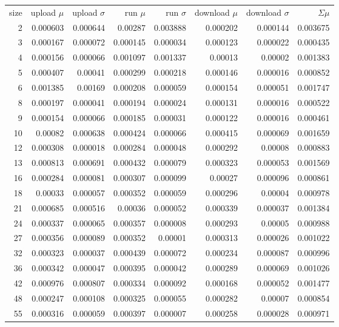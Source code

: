 \begin{longtable}{r r r r r r r r}
size & upload $\mu$  & upload $\sigma$ & run $\mu$ & run $\sigma$ & download $\mu$ & download $\sigma$ & $\Sigma \mu$ \\
2 & 0.000603 & 0.000644 & 0.00287 & 0.003888 & 0.000202 & 0.000144 & 0.003675 \\
3 & 0.000167 & 0.000072 & 0.000145 & 0.000034 & 0.000123 & 0.000022 & 0.000435 \\
4 & 0.000156 & 0.000066 & 0.001097 & 0.001337 & 0.00013 & 0.00002 & 0.001383 \\
5 & 0.000407 & 0.00041 & 0.000299 & 0.000218 & 0.000146 & 0.000016 & 0.000852 \\
6 & 0.001385 & 0.00169 & 0.000208 & 0.000059 & 0.000154 & 0.000051 & 0.001747 \\
8 & 0.000197 & 0.000041 & 0.000194 & 0.000024 & 0.000131 & 0.000016 & 0.000522 \\
9 & 0.000154 & 0.000066 & 0.000185 & 0.000031 & 0.000122 & 0.000016 & 0.000461 \\
10 & 0.00082 & 0.000638 & 0.000424 & 0.000066 & 0.000415 & 0.000069 & 0.001659 \\
12 & 0.000308 & 0.000018 & 0.000284 & 0.000048 & 0.000292 & 0.00008 & 0.000883 \\
13 & 0.000813 & 0.000691 & 0.000432 & 0.000079 & 0.000323 & 0.000053 & 0.001569 \\
16 & 0.000284 & 0.000081 & 0.000307 & 0.000099 & 0.00027 & 0.000096 & 0.000861 \\
18 & 0.00033 & 0.000057 & 0.000352 & 0.000059 & 0.000296 & 0.00004 & 0.000978 \\
21 & 0.000685 & 0.000516 & 0.00036 & 0.000052 & 0.000339 & 0.000037 & 0.001384 \\
24 & 0.000337 & 0.000065 & 0.000357 & 0.000008 & 0.000293 & 0.00005 & 0.000988 \\
27 & 0.000356 & 0.000089 & 0.000352 & 0.00001 & 0.000313 & 0.000026 & 0.001022 \\
32 & 0.000323 & 0.000037 & 0.000439 & 0.000072 & 0.000234 & 0.000087 & 0.000996 \\
36 & 0.000342 & 0.000047 & 0.000395 & 0.000042 & 0.000289 & 0.000069 & 0.001026 \\
42 & 0.000976 & 0.000807 & 0.000334 & 0.000092 & 0.000168 & 0.000052 & 0.001477 \\
48 & 0.000247 & 0.000108 & 0.000325 & 0.000055 & 0.000282 & 0.00007 & 0.000854 \\
55 & 0.000316 & 0.000059 & 0.000397 & 0.000007 & 0.000258 & 0.000028 & 0.000971 \\

\end{longtable}
